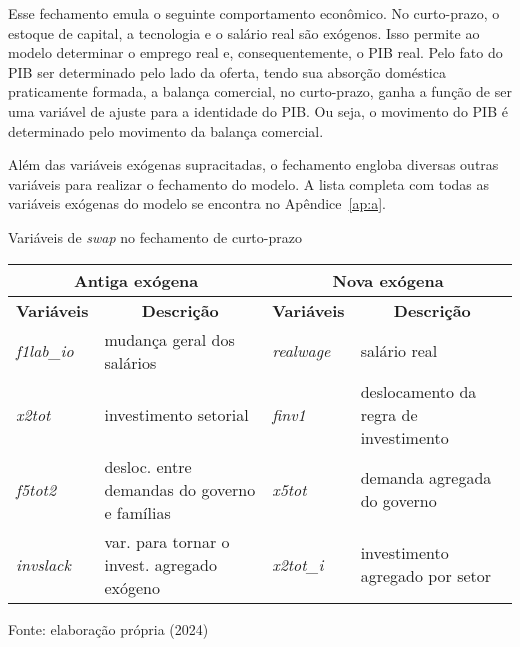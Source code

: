 Esse fechamento emula o seguinte comportamento econômico. No curto-prazo, o estoque de capital, a tecnologia e o salário real são exógenos. Isso permite ao modelo determinar o emprego real e, consequentemente, o PIB real. Pelo fato do PIB ser determinado pelo lado da oferta, tendo sua absorção doméstica praticamente formada, a balança comercial, no curto-prazo, ganha a função de ser uma variável de ajuste para a identidade do PIB. Ou seja, o movimento do PIB é determinado pelo movimento da balança comercial.

Além das variáveis exógenas supracitadas, o fechamento engloba diversas outras variáveis para realizar o fechamento do modelo. A lista completa com todas as variáveis exógenas do modelo se encontra no Apêndice~\ref{ap:a}.


\begin{quadro}[h]
	\centering
	\begin{threeparttable}
		\caption{Variáveis de \textit{swap} no fechamento de curto-prazo} \label{quad:fechamento}
		\footnotesize
		\begin{tabular}{||l m{6.5cm} |l m{5.5cm} ||}
			\hline \hline
			\multicolumn{2}{||c|}{\textbf{Antiga exógena}}                     & \multicolumn{2}{c||}{\textbf{Nova exógena}} \\ \hline
			\textbf{Variáveis} & \multicolumn{1}{c|}{\textbf{Descrição}}      & \textbf{Variáveis} & \multicolumn{1}{c||}{\textbf{Descrição}} \\ \hline
			\textit{f1lab\_io}  & mudança geral dos salários                  & \textit{realwage}  & salário real \\
			\textit{x2tot}     & investimento setorial                        & \textit{finv1}     & deslocamento da regra de investimento \\
			\textit{f5tot2}    & desloc. entre demandas do governo e famílias & \textit{x5tot}     & demanda agregada do governo \\
			\textit{invslack}  & var. para tornar o invest. agregado exógeno  & \textit{x2tot\_i}  & investimento agregado por setor \\ \hline \hline
		\end{tabular}
		\begin{tablenotes}
			\scriptsize
			\item Fonte: elaboração própria (2024)
		\end{tablenotes}
	\end{threeparttable}
\end{quadro}


